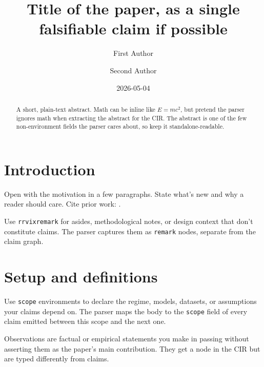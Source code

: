 \documentclass{rrvix}
\title{Title of the paper, as a single falsifiable claim if possible}
\author[1]{First Author}
\author[2]{Second Author}
\affil[1]{Department of X, University Y}
\affil[2]{Independent}
\date{2026-05-04}
\begin{document}
\maketitle

\begin{abstract}
A short, plain-text abstract. Math can be inline like $E = mc^2$, but
pretend the parser ignores math when extracting the abstract for the CIR.
The abstract is one of the few non-environment fields the parser cares
about, so keep it standalone-readable.
\end{abstract}

\section{Introduction}
\label{sec:intro}

Open with the motivation in a few paragraphs. State what's new and why a
reader should care. Cite prior work: \cite{example-prior-work}.

\begin{rrvixremark}
\label{rem:context}
Use \texttt{rrvixremark} for asides, methodological notes, or design
context that don't constitute claims. The parser captures them as
\texttt{remark} nodes, separate from the claim graph.
\end{rrvixremark}

\section{Setup and definitions}
\label{sec:setup}

\begin{scope}
\label{scope:main}
Use \texttt{scope} environments to declare the regime, models, datasets,
or assumptions your claims depend on. The parser maps the body to the
\texttt{scope} field of every claim emitted between this scope and the
next one.
\end{scope}

\begin{observation}
\label{obs:setup}
Observations are factual or empirical statements you make in passing
without asserting them as the paper's main contribution. They get a
node in the CIR but are typed differently from claims.
\end{observation}
\end{document}
